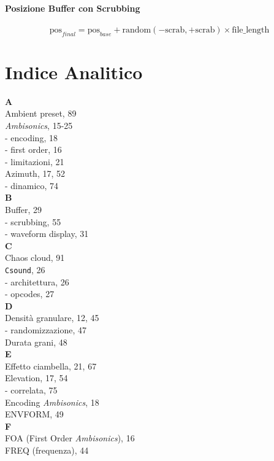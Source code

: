 \documentclass[a4paper,11pt,openany]{book}
\newcommand{\ambisonics}{\textit{Ambisonics}}
\newcommand{\csound}{\texttt{Csound}}
\begin{document}
\subsubsection*{Posizione Buffer con Scrubbing}
\begin{equation}
\text{pos}_{final} = \text{pos}_{base} + \text{random}(-\text{scrab}, +\text{scrab}) \times \text{file\_length}
\end{equation}

\chapter*{Indice Analitico}

\begin{multicols}{2}
\textbf{A}\\
Ambient preset, 89\\
\ambisonics, 15-25\\
- encoding, 18\\
- first order, 16\\
- limitazioni, 21\\
Azimuth, 17, 52\\
- dinamico, 74\\

\textbf{B}\\
Buffer, 29\\
- scrubbing, 55\\
- waveform display, 31\\

\textbf{C}\\
Chaos cloud, 91\\
\csound, 26\\
- architettura, 26\\
- opcodes, 27\\

\textbf{D}\\
Densità granulare, 12, 45\\
- randomizzazione, 47\\
Durata grani, 48\\

\textbf{E}\\
Effetto ciambella, 21, 67\\
Elevation, 17, 54\\
- correlata, 75\\
Encoding \ambisonics, 18\\
ENVFORM, 49\\

\textbf{F}\\
FOA (First Order \ambisonics), 16\\
FREQ (frequenza), 44\\


\end{multicols}
\end{document}
